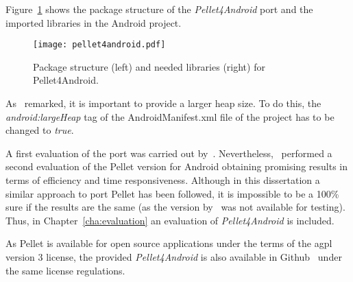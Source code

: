 Figure~\ref{fig:pellet4android} shows the package structure of the
\textit{Pellet4Android} port and the imported libraries in the Android project.
% 

\begin{figure}[H]
\centering
\texttt{[image: pellet4android.pdf]}
\caption{Package structure (left) and needed libraries (right) for Pellet4Android.}
\label{fig:pellet4android}
\end{figure}


As~\citet{yus_android_2013} remarked, it is important to provide a larger heap
size. To do this, the \textit{android:largeHeap} tag of the AndroidManifest.xml 
file of the project has to be changed to \textit{true}.

A first evaluation of the port was carried out by~\citet{yus_android_2013}.
Nevertheless,~\citet{bobed_android_2014} performed a second evaluation of the
Pellet version for Android obtaining promising results in terms of efficiency
and time responsiveness. Although in this dissertation a similar approach to port 
Pellet has been followed, it is impossible to be a 100\% sure if the results are 
the same (as the version by~\citet{yus_android_2013} was not available for testing). 
Thus, in Chapter~\ref{cha:evaluation} an evaluation of \textit{Pellet4Android} is 
included.

As Pellet is available for open source applications under the terms of the \ac{agpl}
version 3 license, the provided \textit{Pellet4Android} is also available in
Github~\citep{pellet4android} under the same license regulations.